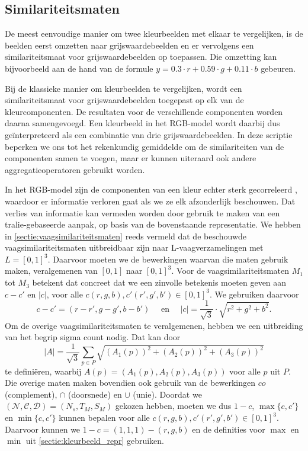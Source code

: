 \subsection{Similariteitsmaten}
\label{sectie:kleurbeelden_similariteitsmaten}

De meest eenvoudige manier om twee kleurbeelden met elkaar te vergelijken, is de beelden eerst omzetten naar 
grijswaardebeelden en er vervolgens een similariteitsmaat voor grijswaardebeelden op toepassen. Die omzetting 
kan bijvoorbeeld aan de hand van de formule $y = 0.3 \cdot r + 0.59 \cdot g + 0.11 \cdot b$ 
\cite{debaets:similariteitsmaten_voor_kleurbeelden} gebeuren.

Bij de klassieke manier om kleurbeelden te vergelijken, wordt een similariteitsmaat 
voor grijswaardebeelden toegepast op elk van de kleurcomponenten. De resultaten voor de
verschillende componenten worden daarna samengevoegd. Een kleurbeeld in het RGB-model wordt daarbij
dus ge\"interpreteerd als een combinatie van drie grijswaardebeelden. In deze scriptie beperken we ons tot
het rekenkundig gemiddelde om de similariteiten van de componenten samen te voegen,
maar er kunnen uiteraard ook andere aggregatieoperatoren gebruikt worden.

In het RGB-model zijn de componenten van een kleur echter sterk gecorreleerd 
\cite{sharma:digital_color_imaging}, waardoor er
informatie verloren gaat als we ze elk afzonderlijk beschouwen. Dat verlies van informatie kan vermeden
worden door gebruik te maken van een tralie-gebaseerde aanpak,
op basis van de bovenstaande representatie.
We hebben in \ref{sectie:vaagsimilariteitsmaten} reeds vermeld dat de beschouwde 
vaagsimilariteitsmaten uitbreidbaar zijn naar L-vaag\-ver\-za\-me\-ling\-en met
$L=[0,1]^3$. Daarvoor moeten we de bewerkingen waarvan die maten gebruik maken, veralgemenen van 
$[0,1]$ naar $[0,1]^3$. 
Voor de vaagsimilariteitsmaten $M_1$ tot $M_3$ betekent dat concreet dat we een zinvolle betekenis 
moeten geven aan $c - c'$ en $|c|$, voor alle $c(r,g,b),c'(r',g',b') \in [0,1]^3$. We gebruiken
daarvoor 
$$
c - c' = (r-r',g-g',b-b') \quad \textrm{ en } \quad |c| = \frac{1}{\sqrt{3}} \cdot \sqrt{r^2 + g^2 + b^2}.
$$
Om de overige vaagsimilariteitsmaten te veralgemenen, hebben we een uitbreiding van het
begrip sigma count nodig. Dat kan door
$$
|A|=\frac{1}{\sqrt{3}}\sum_{p \in P}\sqrt{(A_1(p))^2+(A_2(p))^2+(A_3(p))^2}
$$
te defini\"eren, waarbij $A(p)=(A_1(p),A_2(p),A_3(p))$ voor alle $p$ uit $P$. Die overige maten maken 
bovendien ook gebruik van de bewerkingen $co$ (complement), 
$\cap$ (doorsnede) en $\cup$ (unie). Doordat we 
$(\mathcal{N},\mathcal{C},\mathcal{D})=(N_s,T_M,S_M)$ gekozen hebben, moeten we
dus $1 - c$, $\max \{c,c'\}$ en $\min \{c,c'\}$ kunnen bepalen voor alle 
$c(r,g,b),c'(r',g',b') \in [0,1]^3$. Daarvoor kunnen we $1 - c = (1,1,1) - (r,g,b)$ en de
definities voor $\max$ en $\min$ uit \ref{sectie:kleurbeeld_repr} gebruiken.


